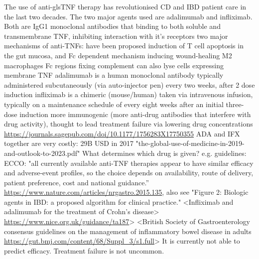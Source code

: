 \begin{outline}
\1 The use of anti-gls{TNF} therapy has revolutionised CD and IBD patient care in the last two decades.
    \2 The two major agents used are adalimumab and infliximab. Both are IgG1 monoclonal antibodies that binding to both soluble and transmembrane TNF, inhibiting interaction with it's receptors \autocite{lichtenstein2013ComprehensiveReviewAntitumor,adegbola2018AntiTNFTherapyCrohn}
    \2 two major mechanisms of anti-TNFs: have been proposed induction of T cell apoptosis in the gut mucosa, and Fc dependent mechanism inducing wound-healing M2 macrophages \autocite{levin2016MechanismActionAntiTNF}
        \3 Fc regions fixing complement can also lyse cells expressing membrane TNF \autocite{adegbola2018AntiTNFTherapyCrohn}
    \2 adalimumab is a human monoclonal antibody
        \3 typically administered subcutaneously (via auto-injector pen) every two weeks, after 2 dose induction \autocite{adegbola2018AntiTNFTherapyCrohn}
    \2 infliximab is a chimeric (mouse/human)
        \3 taken via intravenous infusion, typically on a maintenance schedule of every eight weeks after an initial three-dose induction \autocite{adegbola2018AntiTNFTherapyCrohn}
        \3 more immunogenic (more anti-drug antibodies that interfere with drug activity), thought to lead treatment failure via lowering drug concentrations \autocite{kennedy2019PredictorsAntiTNFTreatment} \url{https://journals.sagepub.com/doi/10.1177/1756283X17750355}
    \2 ADA and IFX together are very costly: 29B USD in 2017 "the-global-use-of-medicine-in-2019-and-outlook-to-2023.pdf"
\1 What determines which drug is given?
    \2 e.g. guidelines:
         ECCO: "all currently available anti-TNF therapies appear to have similar efficacy and adverse-event profiles, so the choice depends on availability, route of delivery, patient preference, cost and national guidance.” \url{https://www.nature.com/articles/nrgastro.2015.135}, also see "Figure 2: Biologic agents in IBD: a proposed algorithm for clinical practice."
        \3 \autocite{dhaens2011LondonPositionStatement}
         <Infliximab and adalimumab for the treatment of Crohn's disease> \url{https://www.nice.org.uk/guidance/ta187}>
         <British Society of Gastroenterology consensus guidelines on the management of inflammatory bowel disease in adults \url{https://gut.bmj.com/content/68/Suppl_3/s1.full}>
    \2 It is currently not able to predict efficacy. Treatment failure is not uncommon.


\end{outline}
